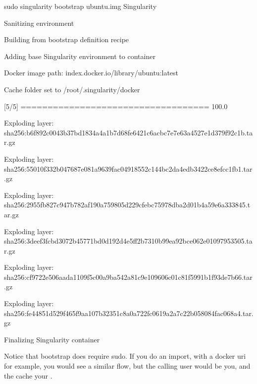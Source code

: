 \documentclass[letterpaper,10pt,english]{sphinxmanual}
\begin{document}
%
\begin{sphinxVerbatim}[commandchars=\\\{\}]
\PYGZdl{} sudo singularity bootstrap ubuntu.img Singularity

Sanitizing environment

Building from bootstrap definition recipe

Adding base Singularity environment to container

Docker image path: index.docker.io/library/ubuntu:latest

Cache folder set to /root/.singularity/docker

[5/5] \textbar{}===================================\textbar{} 100.0\PYGZpc{}

Exploding layer: sha256:b6f892c0043b37bd1834a4a1b7d68fe6421c6acbc7e7e63a4527e1d379f92c1b.tar.gz

Exploding layer: sha256:55010f332b047687e081a9639fac04918552c144bc2da4edb3422ce8efcc1fb1.tar.gz

Exploding layer: sha256:2955fb827c947b782af190a759805d229cfebc75978dba2d01b4a59e6a333845.tar.gz

Exploding layer: sha256:3deef3fcbd3072b45771bd0d192d4e5ff2b7310b99ea92bce062e01097953505.tar.gz

Exploding layer: sha256:cf9722e506aada1109f5c00a9ba542a81c9e109606c01c81f5991b1f93de7b66.tar.gz

Exploding layer: sha256:fe44851d529f465f9aa107b32351c8a0a722fc0619a2a7c22b058084fac068a4.tar.gz

Finalizing Singularity container
\end{sphinxVerbatim}

Notice that bootstrap does require sudo. If you do an import, with a
docker uri for example, you would see a similar flow, but the calling
user would be you, and the cache your .
\end{document}
